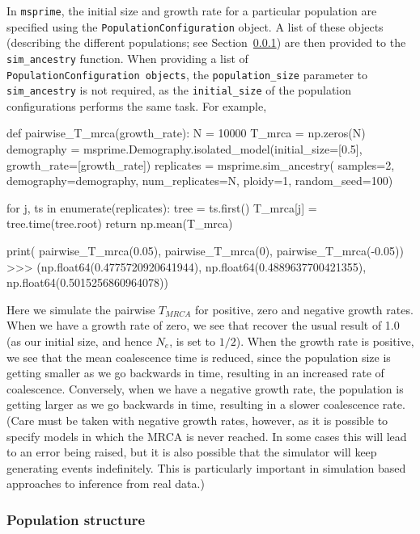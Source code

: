 \documentclass[graybox]{svmult}
\newcommand{\msprime}[0]{\texttt{msprime}}
\begin{document}
In \msprime, the initial size and growth rate for a particular population
are specified using the \texttt{PopulationConfiguration} object. A list
of these objects (describing the different populations; see
Section~\ref{population-structure}) are then provided to the
\texttt{sim\_ancestry}
function. When providing a list of
\texttt{PopulationConfiguration\ objects}, the \texttt{population\_size} parameter to
\texttt{sim\_ancestry} is not required, as the \texttt{initial\_size} of the
population configurations performs the same task. For example,

\begin{pythoncode}
def pairwise_T_mrca(growth_rate):
    N = 10000
    T_mrca = np.zeros(N)
    demography = msprime.Demography.isolated_model(initial_size=[0.5],
                                                   growth_rate=[growth_rate])
    replicates = msprime.sim_ancestry(
        samples=2,
        demography=demography,
        num_replicates=N,
        ploidy=1,
        random_seed=100)

    for j, ts in enumerate(replicates):
        tree = ts.first()
        T_mrca[j] = tree.time(tree.root)
    return np.mean(T_mrca)

print(
    pairwise_T_mrca(0.05), pairwise_T_mrca(0),
    pairwise_T_mrca(-0.05))
>>> (np.float64(0.4775720920641944),
     np.float64(0.4889637700421355),
     np.float64(0.5015256860964078))
\end{pythoncode}

    Here we simulate the pairwise \(T_{MRCA}\) for positive, zero and
negative growth rates. When we have a growth rate of zero, we see that
recover the usual result of 1.0 (as our initial size, and hence \(N_e\),
is set to \(1/2\)). When the growth rate is positive, we see that the
mean coalescence time is reduced, since the population size is getting
smaller as we go backwards in time, resulting in an increased rate of
coalescence. Conversely, when we have a negative growth rate, the
population is getting larger as we go backwards in time, resulting in a
slower coalescence rate. (Care must be taken with negative growth rates,
however, as it is possible to specify models in which the MRCA is never
reached. In some cases this will lead to an error being raised, but it
is also possible that the simulator will keep generating events
indefinitely. This is particularly important in simulation based
approaches to inference from real data.)


\subsubsection{Population structure}\label{population-structure}
\end{document}
